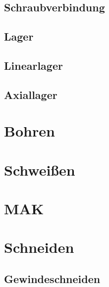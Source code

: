 \documentclass[
	a4paper,
	smallheadings,
	german,
	]
	{scrreprt}
\begin{document}
		\subsection{Schraubverbindung}
	\subsection{Lager}
		\subsection{Linearlager}
		\subsection{Axiallager}
\section{Bohren}
\section{Schweißen}
	\section{MAK}
\section{Schneiden}
\subsection{Gewindeschneiden}


\printbibliography
\end{document}
